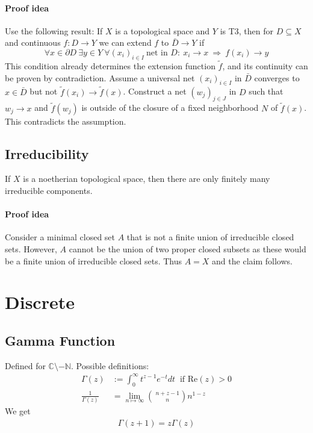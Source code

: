 \documentclass{scrartcl}
\begin{document}
\paragraph{Proof idea} Use the following result: If $X$ is a topological space and $Y$ is T3, then for $D \subseteq X$ and continuous $f: D \to Y$ we can extend $f$ to $\bar{D} \to Y$ if 
\begin{equation*}
    \forall x \in \partial D \ \exists y \in Y \ \forall (x_i)_{i \in I} \ \text{net in $D$}: \ x_i \to x \ \Rightarrow \ f(x_i) \to y
\end{equation*}
This condition already determines the extension function $\tilde{f}$, and its continuity can be proven by contradiction. Assume a universal net $(x_i)_{i \in I}$ in $\bar{D}$ converges to $x \in \bar{D}$ but not $\tilde{f}(x_i) \to \tilde{f}(x)$. Construct a net $(w_j)_{j \in J}$ in $D$ such that $w_j \to x$ and $\tilde{f}(w_j)$ is outside of the closure of a fixed neighborhood $N$ of $\tilde{f}(x)$. This contradicts the assumption.

\subsection{Irreducibility}
If $X$ is a noetherian topological space, then there are only finitely many irreducible components.
\paragraph{Proof idea} Consider a minimal closed set $A$ that is not a finite union of irreducible closed sets.
However, $A$ cannot be the union of two proper closed subsets as these would be a finite union of irreducible closed sets.
Thus $A = X$ and the claim follows.

\section{Discrete}

\subsection{Gamma Function}
Defined for $\mathbb{C} \setminus -\mathbb{N}$. Possible definitions:
\begin{equation}
    \begin{split}
        \Gamma(z) &:= \int_0^{\infty} t^{z - 1} e^{-t} dt \ \text{ if } \text{Re}(z) > 0\\
        \frac 1 {\Gamma(z)} &= \lim_{n \mapsto \infty} {\ n + z - 1 \choose\ n } n^{1-z}\nonumber
    \end{split}
\end{equation}
We get
\begin{equation}
    \begin{split}
        \Gamma(z + 1) = z\Gamma(z) \nonumber
    \end{split}
\end{equation}
\end{document}
